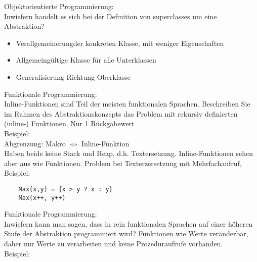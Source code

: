 \begin{card}
	Objektorientierte Programmierung:\\
	Inwiefern handelt es sich bei der Definition von superclasses um eine Abstraktion?
	\hr
	\begin{itemize}
	\item Verallgemeinerungder konkreten Klasse, mit weniger Eigenschaften
	\item Allgemeingültige Klasse für alle Unterklassen
	\item Generalisierung Richtung Oberklasse
	\end{itemize}
\end{card}

\begin{card}
	Funktionale Programmierung:\\
	Inline-Funktionen sind Teil der meisten funktionalen Sprachen. Beschreiben Sie im Rahmen des Abstraktionskonzepts das Problem mit rekursiv definierten (inline-) Funktionen.
	\hr
	Nur 1 Rückgabewert\\
	Beispiel:\\
	\vfill
	Abgrenzung: Makro $\Leftrightarrow$ Inline-Funktion\\
	Haben beide keine Stack und Heap, d.h. Textersetzung. Inline-Funktionen sehen aber aus wie Funktionen. 
	Problem bei Texterzersetzung mit Mehrfachaufruf, Beispiel: 
	\begin{lstlisting}
	Max(x,y) = {x > y ? x : y}
	Max(x++, y++)
	\end{lstlisting}
\end{card}

\begin{card}
	Funktionale Programmierung:\\
	Inwiefern kann man sagen, dass in rein funktionalen Sprachen auf einer höheren Stufe der Abstraktion programmiert wird?
	\hr
	Funktionen wie Werte veränderbar, daher nur Werte zu verarbeiten und keine Prozeduraufrufe vorhanden.\\
	Beispiel: 
\end{card}

